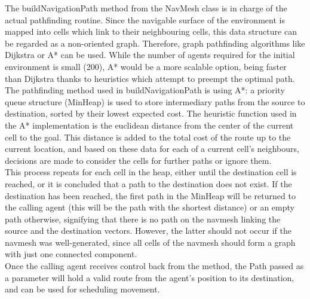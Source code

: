 The buildNavigationPath method from the NavMesh class is in charge of the actual pathfinding routine. Since the navigable surface of the environment is mapped into cells which link to their neighbouring cells, this data structure can be regarded as a non-oriented graph. Therefore, graph pathfinding algorithms like Dijkstra\cite{Dijkstra} or A*\cite{Astar} can be used.  While the number of agents required for the initial environment is small (200), A* would be a more scalable option, being faster than Dijkstra thanks to heuristics which attempt to preempt the optimal path.\\
The pathfinding method used in buildNavigationPath is using A*: a priority queue structure (MinHeap) is used to store intermediary paths from the source to destination, sorted by their lowest expected cost. The heuristic function used in the A* implementation is the euclidean distance from the center of the current cell to the goal. This distance is added to the total cost of the route up to the current location, and based on these data for each of a current cell's neighbours, decisions are made to consider the cells for further paths or ignore them.\\
This process repeats for each cell in the heap, either until the destination cell is reached, or it is concluded that a path to the destination does not exist. If the destination has been reached, the first path in the MinHeap will be returned to the calling agent (this will be the path with the shortest distance) or an empty path otherwise, signifying that there is no path on the navmesh linking the source and the destination vectors. However, the latter should not occur if the navmesh was well-generated, since all cells of the navmesh should form a graph with just one connected component.\\
Once the calling agent receives control back from the method, the Path passed as a parameter will hold a valid route from the agent's position to its destination, and can be used for scheduling movement.

%
%
%
